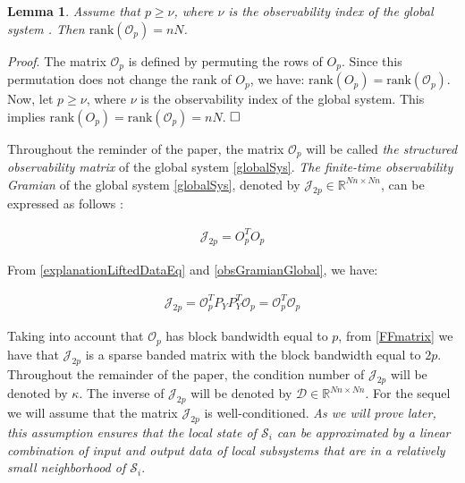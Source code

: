 \documentclass[journal,10pt]{IEEEtran}
\newtheorem{lemma}[thm]{Lemma}
\begin{document}
\begin{lemma}
Assume that $p\ge \nu$, where $\nu$ is the observability index of the global system \cite{luenberger1971,haber2013mhe}. Then $\text{rank}(\mathcal{O}_{p})=nN$.
\label{observabilityTheorem}  \\
\end{lemma}
\textit{Proof}. 
The matrix $\mathcal{O}_{p}$ is defined by permuting the rows of $O_{p}$. Since this permutation does not change the rank of $O_{p}$, we have: $\text{rank}(O_{p})=\text{rank}(\mathcal{O}_{p})$. Now, let $p \ge \nu$, where $\nu$ is the observability index of the global system. This implies $\text{rank}(O_{p})=\text{rank}(\mathcal{O}_{p})=nN$.  $\hfill \square$
\\ \par
Throughout the reminder of the paper, the matrix $\mathcal{O}_{p}$ will be called \textit{the structured observability matrix} of the global system \eqref{globalSys}. \textit{The finite-time observability Gramian} of the global system \eqref{globalSys}, denoted by $\mathcal{J}_{2p}\in \mathbb{R}^{Nn\times Nn}$, can be expressed as follows \cite{lim1996hankel,antoulas2005approximation}:
\begin{small}
\begin{align}
\mathcal{J}_{2p}=O_{p}^{T}O_{p}
\label{obsGramianGlobal}
\end{align}
\end{small} 
From \eqref{explanationLiftedDataEq} and \eqref{obsGramianGlobal}, we have:
\begin{small}
\begin{align}
\mathcal{J}_{2p}=\mathcal{O}_{p}^{T}P_{Y}P_{Y}^{T}\mathcal{O}_{p}=\mathcal{O}_{p}^{T}\mathcal{O}_{p}
\label{FFmatrix}
\end{align}
\end{small}
Taking into account that $\mathcal{O}_{p}$ has block bandwidth equal to $p$, from \eqref{FFmatrix} we have that $\mathcal{J}_{2p}$ is a sparse banded matrix with the block bandwidth equal to $2p$. Throughout the remainder of the paper, the condition number of $\mathcal{J}_{2p}$ will be denoted by $\kappa$. The inverse of $\mathcal{J}_{2p}$ will be denoted by $\mathcal{D}\in \mathbb{R}^{Nn\times Nn}$. For the sequel we will assume that the matrix $\mathcal{J}_{2p}$ is well-conditioned. \textit{As we will prove later, this assumption ensures that the local state of $\mathcal{S}_{i}$ can be approximated by a linear combination of input and output data of local subsystems that are in a relatively small neighborhood of $\mathcal{S}_{i}$}. \\
\end{document}
